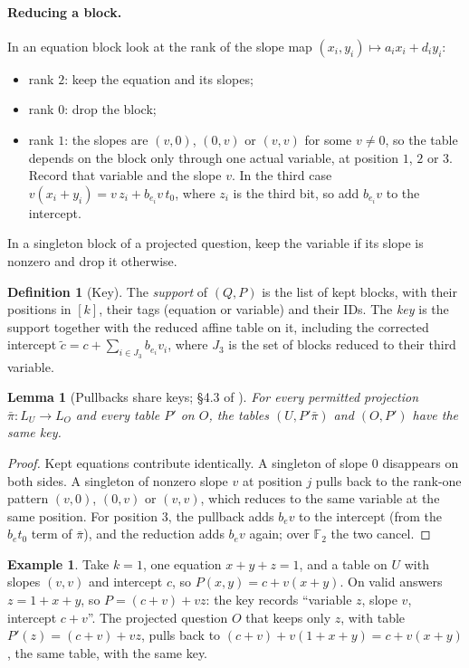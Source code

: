 \documentclass[11pt]{article}
\newtheorem{lemma}[theorem]{Lemma}
\theoremstyle{definition}
\newtheorem{definition}[theorem]{Definition}
\newtheorem{example}[theorem]{Example}
\theoremstyle{remark}
\newcommand{\F}{\mathbb F}
\newcommand{\bpi}{\bar\pi}
\begin{document}
\paragraph{Reducing a block.} In an equation block look at the rank of the
slope map $(x_i,y_i)\mapsto a_ix_i+d_iy_i$:
\begin{itemize}
\item rank $2$: keep the equation and its slopes;
\item rank $0$: drop the block;
\item rank $1$: the slopes are $(v,0)$, $(0,v)$ or $(v,v)$ for some $v\ne0$,
  so the table depends on the block only through one actual variable, at
  position $1$, $2$ or $3$. Record that variable and the slope $v$. In the third
  case $v(x_i+y_i)=v\,z_i+b_{e_i}v\,t_0$, where $z_i$ is the third bit, so add
  $b_{e_i}v$ to the intercept.
\end{itemize}
In a singleton block of a projected question, keep the variable if its slope is
nonzero and drop it otherwise.

\begin{definition}[Key]
The \emph{support} of $(Q,P)$ is the list of kept blocks, with their positions
in $[k]$, their tags (equation or variable) and their IDs. The \emph{key} is the
support together with the reduced affine table on it, including the corrected
intercept $\tilde c=c+\sum_{i\in J_3}b_{e_i}v_i$, where $J_3$ is the set of
blocks reduced to their third variable.
\end{definition}

\begin{lemma}[Pullbacks share keys; \S4.3 of \cite{OpenAI-UGC}]\label{lem:keys}
For every permitted projection $\bpi\colon L_U\to L_O$ and every table $P'$ on $O$,
the tables $(U,P'\bpi)$ and $(O,P')$ have the same key.
\end{lemma}

\begin{proof}
Kept equations contribute identically. A singleton of slope $0$ disappears on
both sides. A singleton of nonzero slope $v$ at position $j$ pulls back to the
rank-one pattern $(v,0)$, $(0,v)$ or $(v,v)$, which reduces to the same variable
at the same position. For position $3$, the pullback adds $b_ev$ to the
intercept (from the $b_et_0$ term of $\bpi$), and the reduction adds $b_ev$ again;
over $\F_2$ the two cancel.
\end{proof}

\begin{example}
Take $k=1$, one equation $x+y+z=1$, and a table on $U$ with slopes $(v,v)$ and
intercept $c$, so $P(x,y)=c+v(x+y)$. On valid answers $z=1+x+y$, so
$P=(c+v)+vz$: the key records ``variable $z$, slope $v$, intercept $c+v$''. The
projected question $O$ that keeps only $z$, with table $P'(z)=(c+v)+vz$, pulls
back to $(c+v)+v(1+x+y)=c+v(x+y)$, the same table, with the same key.
\end{example}
\end{document}
